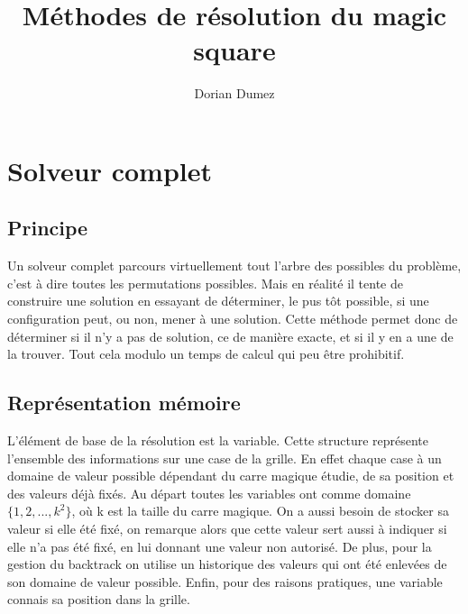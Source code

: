 \documentclass[12pt,a4paper]{article}
\title{Méthodes de résolution du magic square}
\author{Dorian Dumez}
\begin{document}
\maketitle
\section{Solveur complet}

\subsection{Principe}

Un solveur complet parcours virtuellement tout l'arbre des possibles du problème, c'est à dire toutes les permutations possibles. Mais en réalité il tente de construire une solution en essayant de déterminer, le pus tôt possible, si une configuration peut, ou non, mener à une solution. Cette méthode permet donc de déterminer si il n'y a pas de solution, ce de manière exacte, et si il y en a une de la trouver. Tout cela modulo un temps de calcul qui peu être prohibitif.

\subsection{Représentation mémoire}

L’élément de base de la résolution est la variable. Cette structure représente l'ensemble des informations sur une case de la grille. En effet chaque case à un domaine de valeur possible dépendant du carre magique étudie, de sa position et des valeurs déjà fixés. Au départ toutes les variables ont comme domaine $\{ 1,2,..., k^2 \}$, où k est la taille du carre magique. On a aussi besoin de stocker sa valeur si elle été fixé, on remarque alors que cette valeur sert aussi à indiquer si elle n'a pas été fixé, en lui donnant une valeur non autorisé. De plus, pour la gestion du backtrack on utilise un historique des valeurs qui ont été enlevées de son domaine de valeur possible. Enfin, pour des raisons pratiques, une variable connais sa position dans la grille.\\
\end{document}

